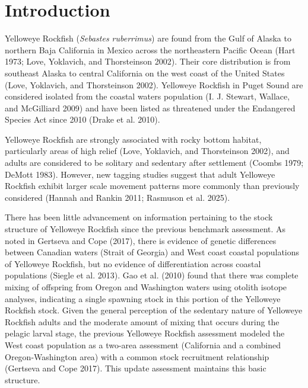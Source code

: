 \documentclass[
]{scrartcl}
\begin{document}
\pagebreak

\newpage{}

\setlength{\parskip}{5mm plus1mm minus1mm}
\setcounter{page}{1}
\setcounter{section}{0}
\renewcommand{\thefigure}{\arabic{figure}}
\renewcommand{\thetable}{\arabic{table}}
\setcounter{table}{0}
\setcounter{figure}{0}

\section{Introduction}\label{introduction}

Yelloweye Rockfish (\emph{Sebastes ruberrimus}) are found from the Gulf
of Alaska to northern Baja California in Mexico across the northeastern
Pacific Ocean (Hart 1973; Love, Yoklavich, and Thorsteinson 2002). Their
core distribution is from southeast Alaska to central California on the
west coast of the United States (Love, Yoklavich, and Thorsteinson
2002). Yelloweye Rockfish in Puget Sound are considered isolated from
the coastal waters population (I. J. Stewart, Wallace, and McGilliard
2009) and have been listed as threatened under the Endangered Species
Act since 2010 (Drake et al. 2010).

Yelloweye Rockfish are strongly associated with rocky bottom habitat,
particularly areas of high relief (Love, Yoklavich, and Thorsteinson
2002), and adults are considered to be solitary and sedentary after
settlement (Coombs 1979; DeMott 1983). However, new tagging studies
suggest that adult Yelloweye Rockfish exhibit larger scale movement
patterns more commonly than previously considered (Hannah and Rankin
2011; Rasmuson et al. 2025).

There has been little advancement on information pertaining to the stock
structure of Yelloweye Rockfish since the previous benchmark assessment.
As noted in Gertseva and Cope (2017), there is evidence of genetic
differences between Canadian waters (Strait of Georgia) and West coast
coastal populations of Yelloweye Rockfish, but no evidence of
differentiation across coastal populations (Siegle et al. 2013). Gao et
al. (2010) found that there was complete mixing of offspring from Oregon
and Washington waters using otolith isotope analyses, indicating a
single spawning stock in this portion of the Yelloweye Rockfish stock.
Given the general perception of the sedentary nature of Yelloweye
Rockfish adults and the moderate amount of mixing that occurs during the
pelagic larval stage, the previous Yelloweye Rockfish assessment modeled
the West coast population as a two-area assessment (California and a
combined Oregon-Washington area) with a common stock recruitment
relationship (Gertseva and Cope 2017). This update assessment maintains
this basic structure.
\end{document}
